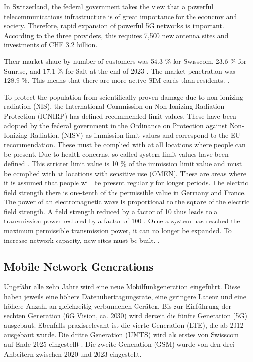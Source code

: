 \begin{English}
    In Switzerland, the federal government takes the view that a powerful telecommunications infrastructure is of great importance for the economy and society. Therefore, rapid expansion of powerful 5G networks is important. According to the three providers, this requires 7,500 new antenna sites and investments of CHF 3.2 billion. \cite{bundesratNachhaltigesMobilfunknetzBericht2022}

    Their market share by number of customers was 54.3 \% for Swisscom, 23.6 \% for Sunrise, and 17.1 \% for Salt at the end of 2023 \cite{bakomMarktanteileMobilfunknetz}. The market penetration was 128.9 \%. This means that there are more active SIM cards than residents. \cite{bakomAnzahlMobilfunkkundinnenUnd}.

    To protect the population from scientifically proven damage due to non-ionizing radiation (NIS), the International Commission on Non-Ionizing Radiation Protection (ICNIRP) has defined recommended limit values. These have been adopted by the federal government in the Ordinance on Protection against Non-Ionizing Radiation (NISV) as immission limit values and correspond to the EU recommendation. These must be complied with at all locations where people can be present. Due to health concerns, so-called system limit values have been defined \cite{baumannMitVerordnungUeber2005}. This stricter limit value is 10 \% of the immission limit value and must be complied with at locations with sensitive use (OMEN). These are areas where it is assumed that people will be present regularly for longer periods. The electric field strength there is one-tenth of the permissible value in Germany and France. The power of an electromagnetic wave is proportional to the square of the electric field strength. A field strength reduced by a factor of 10 thus leads to a transmission power reduced by a factor of 100 \cite{chance5gAnlagegrenzwerteImMobilfunk}. Once a system has reached the maximum permissible transmission power, it can no longer be expanded. To increase network capacity, new sites must be built. \cite{bundesratNachhaltigesMobilfunknetzBericht2022}.
\end{English}

\subsection{Mobile Network Generations}
\begin{German}
    Ungefähr alle zehn Jahre wird eine neue Mobilfunkgeneration eingeführt. Diese haben jeweils eine höhere Datenübertragungsrate, eine geringere Latenz und eine höhere Anzahl an gleichzeitig verbundenen Geräten. Bis zur Einführung der sechten Generation (6G Vision, ca. 2030) wird derzeit die fünfte Generation (5G) ausgebaut. Ebenfalls praxisrelevant ist die vierte Generation (LTE), die ab 2012 ausgebaut wurde. Die dritte Generation (UMTS) wird als erstes von Swisscom auf Ende 2025 eingestellt \cite{swisscomAbschaltung3GErneuerung}. Die zweite Generation (GSM) wurde von den drei Anbeitern zwischen 2020 und 2023 eingestellt.
\end{German}

